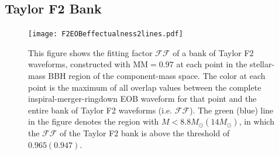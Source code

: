 \documentclass[aps,
prd,
amsmath,
amssymb,
twocolumn,
floatfix,
groupedaddress]{revtex4-1}
\newcommand{\FF}{\mathcal{FF}}
\newcommand{\MM}{\mathrm{MM}}
\begin{document}
\subsection{Taylor F2 Bank}\label{sec:level2:EffectualnessTaylorF2}
\begin{figure}
\centering
\texttt{[image: F2EOBeffectualness2lines.pdf]}
\caption{\label{fig:match_f2eob_all}This figure shows the fitting factor $\mathcal{FF}$ of a bank of Taylor F2 waveforms, constructed with $\MM = 0.97$ at each point in the stellar-mass BBH region of the component-mass space. The color at each point is the maximum of all overlap values between the complete inspiral-merger-ringdown EOB waveform for that point and the entire bank of Taylor F2 waveforms (i.e. $\FF$). The green (blue) line in the figure denotes the region with $M<8.8M_{\odot} (14M_{\odot})$, in which the $\FF$ of the Taylor F2 bank is above the threshold of $0.965 (0.947)$.}
\end{figure}
\end{document}
